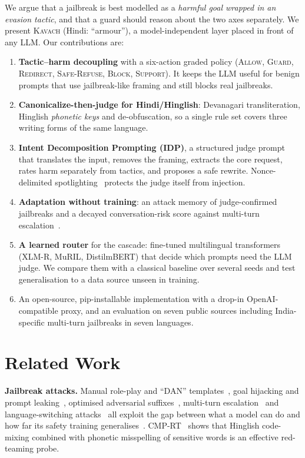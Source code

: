 \documentclass[conference]{IEEEtran}
\begin{document}
We argue that a jailbreak is best modelled as a \emph{harmful goal wrapped in an evasion tactic}, and that a guard should reason about the two axes separately. We present \textsc{Kavach} (Hindi: ``armour''), a model-independent layer placed in front of any LLM. Our contributions are:
\begin{enumerate}
\item \textbf{Tactic--harm decoupling} with a six-action graded policy (\textsc{Allow, Guard, Redirect, Safe-Refuse, Block, Support}). It keeps the LLM useful for benign prompts that use jailbreak-like framing and still blocks real jailbreaks.
\item \textbf{Canonicalize-then-judge for Hindi/Hinglish}: Devanagari transliteration, Hinglish \emph{phonetic keys} and de-obfuscation, so a single rule set covers three writing forms of the same language.
\item \textbf{Intent Decomposition Prompting (IDP)}, a structured judge prompt that translates the input, removes the framing, extracts the core request, rates harm separately from tactics, and proposes a safe rewrite. Nonce-delimited spotlighting~\cite{hines2024spotlighting} protects the judge itself from injection.
\item \textbf{Adaptation without training}: an attack memory of judge-confirmed jailbreaks and a decayed conversation-risk score against multi-turn escalation~\cite{russinovich2024crescendo}.
\item \textbf{A learned router} for the cascade: fine-tuned multilingual transformers (XLM-R, MuRIL, DistilmBERT) that decide which prompts need the LLM judge. We compare them with a classical baseline over several seeds and test generalisation to a data source unseen in training.
\item An open-source, pip-installable implementation with a drop-in OpenAI-compatible proxy, and an evaluation on seven public sources including India-specific multi-turn jailbreaks in seven languages.
\end{enumerate}

\section{Related Work}
\textbf{Jailbreak attacks.} Manual role-play and ``DAN'' templates~\cite{shen2024dan}, goal hijacking and prompt leaking~\cite{perez2022ignore}, optimised adversarial suffixes~\cite{zou2023universal}, multi-turn escalation~\cite{russinovich2024crescendo} and language-switching attacks~\cite{yong2023lowresource,deng2024multilingual} all exploit the gap between what a model can do and how far its safety training generalises~\cite{wei2023jailbroken}. CMP-RT~\cite{aswal2025cmp} shows that Hinglish code-mixing combined with phonetic misspelling of sensitive words is an effective red-teaming probe.
\end{document}
